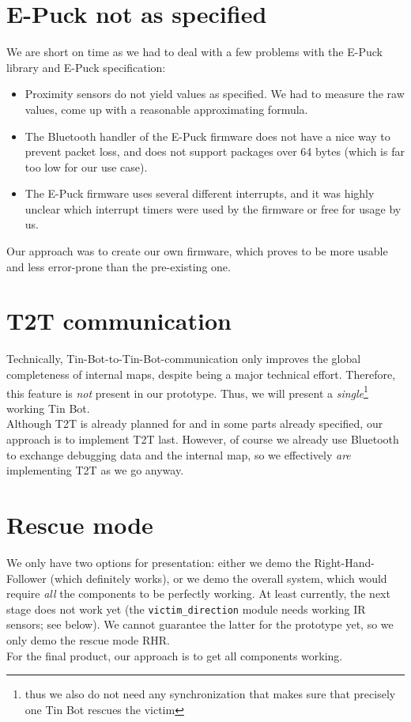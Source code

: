 \documentclass[a4paper,parskip,headheight=38pt]{scrartcl} %
\begin{document}
\section{E-Puck not as specified}

We are short on time as we had to deal with a few problems with the
E-Puck library and E-Puck specification:
\begin{itemize}
    \item Proximity sensors do not yield values as specified.  We had
    to measure the raw values, come up with a reasonable approximating
    formula.
    \item The Bluetooth handler of the E-Puck firmware does not have a
    nice way to prevent packet loss, and does not support packages over
    64 bytes (which is far too low for our use case).
    \item The E-Puck firmware uses several different interrupts, and it
    was highly unclear which interrupt timers were used by the firmware
    or free for usage by us.
\end{itemize}

Our approach was to create our own firmware, which proves to
be more usable and less error-prone than the pre-existing one.

\section{T2T communication}

Technically, Tin-Bot-to-Tin-Bot-communication only improves the global
completeness of internal maps, despite being a major technical effort.
Therefore, this feature is \emph{not} present in our prototype.  Thus,
we will present a \emph{single}\footnote{thus we also do not need any
synchronization that makes sure that precisely one Tin Bot rescues the
victim} working Tin Bot.
 \\
Although T2T is already planned for and in some parts already
specified, our approach is to implement T2T last.  However, of course
we already use Bluetooth to exchange debugging data and the internal
map, so we effectively \emph{are} implementing T2T as we go anyway.

\section{Rescue mode}

We only have two options for presentation: either we demo the
Right-Hand-Follower (which definitely works), or we demo the overall
system, which would require \emph{all} the components to be perfectly
working.  At least currently, the next stage does not work yet (the
\texttt{victim\_direction} module needs working IR sensors; see below).
We cannot guarantee the latter for the prototype yet, so we only demo
the rescue mode RHR.
 \\
For the final product, our approach is to get all components working.
\end{document}
